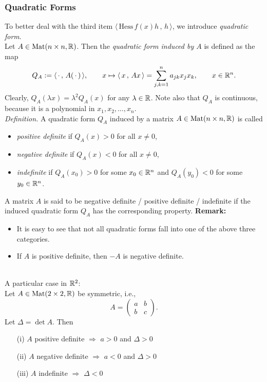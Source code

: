 \documentclass[10pt, t, allowdisplaybreaks]{beamer}
\renewcommand{\emph}[1]{{\color{Turquoise3}\textsl{#1}}}
\newcommand{\myseries}[2]{$#1_1,#1_2,\dots,#1_#2$}
\newcommand{\nullspace}{~\\[15pt]}
\newcommand{\scp}[2]{\langle\,#1\,,\,#2\,\rangle} \newcommand{\scpp}{\langle\,\cdot\,,\,\cdot\,\rangle}
\begin{document}
\begin{frame}[allowframebreaks]
    \frametitle{Quadratic Forms}
    To better deal with the third item $\scp{\text{Hess}\,f(x)h}{h}$, we introduce \emph{quadratic form}.\nullspace
    Let $A\in\text{Mat}(n\times n,\mathbb{R})$. Then the \emph{quadratic form induced by $A$} is defined as the map
    \[Q_A:=\scp{\cdot}{A(\,\cdot\,)},\qquad
        x\mapsto\scp{x}{Ax}=\sum_{j,k=1}^{n}a_{jk}x_jx_k,
        \qquad x\in\R^n.\]
    Clearly, $Q_A(\lambda x)=\lambda^2Q_A(x)$ for any $\lambda\in\mathbb{R}$. Note also that $Q_A$ is continuous, because it is a polynomial in \myseries{x}{n}.\\[8pt]
    \emph{Definition.} A quadratic form $Q_A$ induced by a matrix $A\in\text{Mat}(n\times n,\mathbb{R})$ is called
    \begin{itemize}
        \item \emph{positive definite} if $Q_A(x)>0$ for all $x\neq0$,
        \item \emph{negative definite} if $Q_A(x)<0$ for all $x\neq0$,
        \item \emph{indefinite} if $Q_A(x_0)>0$ for some $x_0\in\mathbb{R}^n$ and $Q_A(y_0)<0$ for some $y_0\in\mathbb{R}^n$.
    \end{itemize}
    A matrix $A$ is said to be negative definite / positive definite / indefinite if the induced quadratic form $Q_A$ has the corresponding property.
    \newpage
    \textbf{Remark:}
    \begin{itemize}
        \item It is easy to see that not all quadratic forms fall into one of the above
              three categories.
        \item If $A$ is positive definite, then $-A$ is negative definite.
    \end{itemize}
    \nullspace
    A particular case in $\mathbb{R}^2$:\\[8pt]
    Let $A\in\text{Mat}(2\times 2,\mathbb{R})$ be symmetric, i.e.,
    \[A=\begin{pmatrix}
            a & b \\
            b & c
        \end{pmatrix}.\]
    Let $\Delta=\det A$. Then
    \begin{itemize}
        \item[(i)] $A$ positive definite $\Rightarrow$ $a>0$ and $\Delta>0$
        \item[(ii)] $A$ negative definite $\Rightarrow$ $a<0$ and $\Delta>0$
        \item[(iii)] $A$ indefinite $\Rightarrow$ $\Delta<0$
    \end{itemize}
\end{frame}
\end{document}
